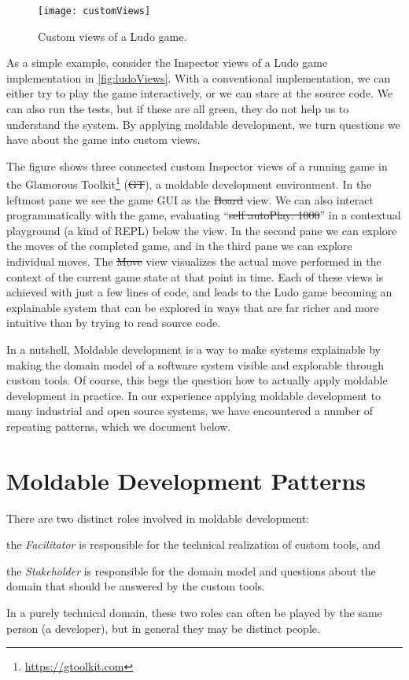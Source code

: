 \documentclass[sigconf]{acmart}
\newcommand{\GT}{\st{GT}\xspace} %
\begin{document}
\begin{figure}[h]
  \texttt{[image: customViews]}
  \caption{Custom views of a Ludo game.}
  \label{fig:ludoViews}
\end{figure}

As a simple example, consider the Inspector views of a Ludo game implementation in \autoref{fig:ludoViews}.
With a conventional implementation, we can either try to play the game interactively, or we can stare at the source code.
We can also run the tests, but if these are all green, they do not help us to understand the system.
By applying moldable development, we turn questions we have about the game into custom views.

The figure shows three connected custom Inspector views of a running game in the Glamorous Toolkit\footnote{\url{https://gtoolkit.com}} (\GT), a moldable development environment.
In the leftmost pane we see the game GUI as the \st{Board} view.
We can also interact programmatically with the game, evaluating ``\st{self autoPlay: 1000}'' in a contextual playground (a kind of REPL) below the view.
In the second pane we can explore the moves of  the completed game, and in the third pane we can explore individual moves.
The \st{Move} view visualizes the actual move performed in the context of the current game state at that point in time.
Each of these views is achieved with just a few lines of code, and leads to the Ludo game becoming an explainable system that can be explored in ways that are far richer and more intuitive than by trying to read source code.

In a nutshell, Moldable development is a way to make systems explainable by making the domain model of a software system visible and explorable through custom tools.
Of course, this begs the question how to actually apply moldable development in practice.
In our experience applying moldable development to many industrial and open source systems, we have encountered a number of repeating patterns, which we document below.

\section{Moldable Development Patterns}

There are two distinct roles involved in moldable development:
\begin{inparaenum}[(i)]
\item the \emph{Facilitator} is responsible for the technical realization of custom tools, and
\item the \emph{Stakeholder} is responsible for the domain model and questions about the domain that should be answered by the custom tools.
\end{inparaenum}
In a purely technical domain, these two roles can often be played by the same person (\ie a developer), but in general they may be distinct people.
\end{document}
